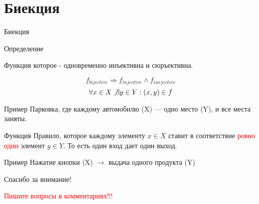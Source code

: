 \documentclass{beamer}
\newenvironment{rusdefinition}[1][Определение]{
    \begin{block}{#1}
}{\end{block}}
\newenvironment{rexample}[1][Пример]{\begin{exampleblock}{#1}}{\end{exampleblock}}
\begin{document}
\section{Биекция}

\begin{frame}{Биекция}
    \begin{rusdefinition}
        Функция которое - одновременно инъективна и сюръективна.
    \end{rusdefinition}
    \[ f_{bijective} \Rightarrow f_{injective} \land f_{surjective} \]
    \[ \forall x \in X \not\exists y \in Y : (x,y) \in f \]
    \begin{rexample}
    Парковка, где каждому автомобилю (X) — одно место (Y), и все места заняты.
    \end{rexample}
\end{frame}

\begin{frame}{Функция}
    Правило, которое каждому элементу $x \in X$ ставит в соответствие \textcolor{red}{ровно один} элемент $y \in Y$. То есть один вход дает один выход.
    \begin{rexample}
Нажатие кнопки (X) $\rightarrow$ выдача одного продукта (Y)
\end{rexample}
\end{frame}

\begin{frame}{}
    \centering
    \Large Спасибо за внимание!
    
    \vspace{1cm}
    \small \textcolor{red}{Пишите вопросы в комментариях!!!}
\end{frame}
\end{document}
